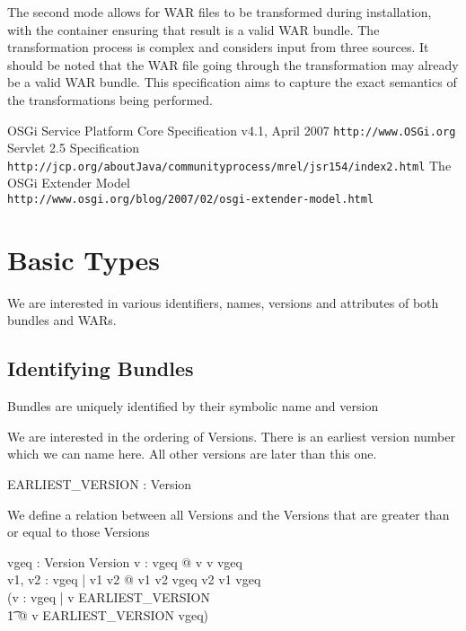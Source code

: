 \documentclass[a4paper,12pt]{article}
\begin{document}
The second mode allows for WAR files to be transformed during installation, with the container ensuring that result is a valid WAR bundle. The transformation process is complex and considers input from three sources. It should be noted that the WAR file going through the transformation may already be a valid WAR bundle. This specification aims to capture the exact semantics of the transformations being performed.

\begin{thebibliography}{99}
     OSGi Service Platform Core Specification v4.1, April 2007 {\tt http://www.OSGi.org}
     Servlet 2.5 Specification \\
      {\tt http://jcp.org/aboutJava/communityprocess/mrel/jsr154/index2.html}
     The OSGi Extender Model \\
    {\tt http://www.osgi.org/blog/2007/02/osgi-extender-model.html}
\end{thebibliography}
    
\clearpage
\section{Basic Types}
\label{cha:basictypes}

We are interested in various identifiers, names, versions and attributes of both bundles and WARs.

\subsection{Identifying Bundles}

Bundles are uniquely identified by their symbolic name and version
\begin{zed}
\end{zed}

We are interested in the ordering of Versions. There is an earliest version number which we can name here. All other versions are later than this one. 

\begin{axdef}
 	EARLIEST\_VERSION : Version
\end{axdef}

We define a relation between all Versions and the Versions that are greater than or equal to those Versions

\begin{axdef}
vgeq : Version \rel Version
\where
\forall v : \dom vgeq @ v \mapsto v \in vgeq \\
\forall v1, v2 : \dom vgeq | v1 \neq v2 @ v1 \mapsto v2 \in vgeq \implies v2 \mapsto v1 \notin vgeq \\
\lnot (\exists v : \dom vgeq | v \neq EARLIEST\_VERSION \\
\t1 @ v \mapsto EARLIEST\_VERSION \in vgeq) \\
\end{axdef}
\end{document}
